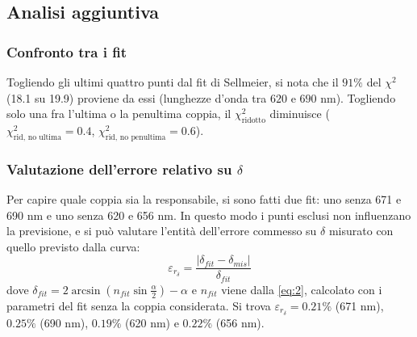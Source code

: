 \documentclass[10pt,twocolumn]{article}
\begin{document}
      \subsection{Analisi aggiuntiva}\label{par:err_par}
          \subsubsection{Confronto tra i fit}
\noindent Togliendo gli ultimi quattro punti dal fit di Sellmeier, si nota che il $91\%$ del $\chi^2$ (18.1 su 19.9) proviene da essi (lunghezze d'onda tra $620$ e $690\text{ nm}$). 
Togliendo solo una fra l'ultima o la penultima coppia, il $\chi^2_{\text{ridotto}}$ diminuisce ($\chi^2_{\text{rid, no ultima}} = 0.4$, $\chi^2_{\text{rid, no penultima}} = 0.6$).

    \begin{table}[H]
      \centering

      \small
            \caption{Fit con la \eqref{eq:2} (Sellmeier) e con la retta \eqref{eq:3}, con e senza le coppie di punti con residuo alto}
                \label{tab:fit}
    \end{table}

\subsubsection{Valutazione dell'errore relativo su $\delta$}
\noindent Per capire quale coppia sia la responsabile, si sono fatti due fit: uno senza 671 e 690 nm e uno senza 620 e 656 nm. In questo modo i punti esclusi non influenzano la previsione, e si può valutare l'entità dell'errore commesso su $\delta$ misurato con quello previsto dalla curva:
    \begin{equation}
      \varepsilon_{r_{\delta}} = \frac{|\delta_{fit}-\delta_{mis}|}{\delta_{fit}}
      \label{eq:4}
    \end{equation}
    dove $\delta_{fit}=2\arcsin\!\left(n_{fit}\sin\frac{\alpha}{2}\right)-\alpha$ e $n_{fit}$ viene dalla \eqref{eq:2}, calcolato con i parametri del fit senza la coppia considerata. Si trova $\varepsilon_{r_{\delta}}=0.21\%$ (671 nm), $0.25\%$ (690 nm), $0.19\%$ (620 nm) e $0.22\%$ (656 nm).
\end{document}
